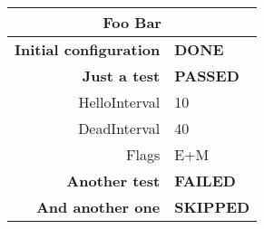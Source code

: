 \begin{tabular}{|r|l|} 
	\hline 
	\multicolumn{2}{|c|}{Foo Bar} \\ 
	\hline 
	\hline 
	\textbf{Initial configuration} & \textbf{DONE} \\
	\hline 
	\textbf{Just a test} & \textbf{PASSED} \\
	\hline 
	HelloInterval & 10 \\
	DeadInterval & 40 \\
	Flags & E+M \\
	\hline 
	\textbf{Another test} & \textbf{FAILED} \\
	\hline 
	\textbf{And another one} & \textbf{SKIPPED} \\
	\hline 
\end{tabular}
